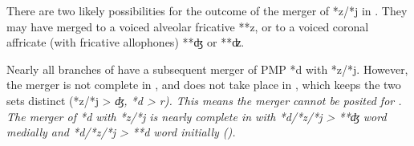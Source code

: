 There are two likely possibilities for the outcome of the merger
of *z/*j in .
They may have merged to a voiced alveolar fricative **z,
or to a voiced coronal affricate (with fricative allophones) **ʤ or **ʣ.

Nearly all branches of  have a subsequent merger
of PMP *d with *z/*j.
However, the merger is not complete in ,
and does not take place in , which keeps the two sets distinct
(*z/*j > \it{ʤ}, *d > \it{r}).
This means the merger cannot be posited for .
The merger of *d with *z/*j is nearly complete in 
with *d/*z/*j > **ʤ word medially
and *d/*z/*j > **d word initially ().
